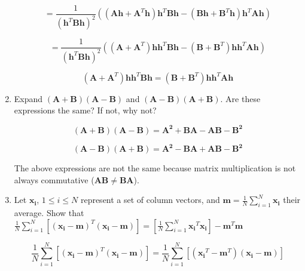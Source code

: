 \documentclass[fleqn]{article}
\begin{document}
\begin{enumerate}
		\begin{equation*}
			 = \frac{1}{(\mathbf{h}^T\mathbf{B}\mathbf{h})^2}\left(\left(\mathbf{Ah} + \mathbf{A}^T\mathbf{h}\right)\mathbf{h}^T\mathbf{B}\mathbf{h} - \left(\mathbf{Bh} + \mathbf{B}^T\mathbf{h}\right)\mathbf{h}^T\mathbf{A}\mathbf{h}\right)
		\end{equation*}
		
		\begin{equation*}
			 = \frac{1}{(\mathbf{h}^T\mathbf{B}\mathbf{h})^2}\left(\left(\mathbf{A} + \mathbf{A}^T\right)\mathbf{h}\mathbf{h}^T\mathbf{B}\mathbf{h} - \left(\mathbf{B} + \mathbf{B}^T\right)\mathbf{h}\mathbf{h}^T\mathbf{A}\mathbf{h}\right)
		\end{equation*}
		
		\begin{equation*}
			\left(\mathbf{A} + \mathbf{A}^T\right)\mathbf{h}\mathbf{h}^T\mathbf{B}\mathbf{h} = \left(\mathbf{B} + \mathbf{B}^T\right)\mathbf{h}\mathbf{h}^T\mathbf{A}\mathbf{h}
		\end{equation*}
		
		\item Expand $(\mathbf{A} + \mathbf{B})(\mathbf{A} - \mathbf{B})$ and $(\mathbf{A} - \mathbf{B})(\mathbf{A} + \mathbf{B})$. Are these expressions the same? If not, why not?
		
		\begin{equation*}
		(\mathbf{A} + \mathbf{B})(\mathbf{A} - \mathbf{B}) = \mathbf{A^2} + \mathbf{B}\mathbf{A} - \mathbf{A}\mathbf{B} - \mathbf{B^2}
		\end{equation*}
		
		\begin{equation*}
		(\mathbf{A} - \mathbf{B})(\mathbf{A} + \mathbf{B}) = \mathbf{A^2} - \mathbf{B}\mathbf{A} + \mathbf{A}\mathbf{B} - \mathbf{B^2}
		\end{equation*}
		
		The above expressions are not the same because matrix multiplication is not always commutative ($\mathbf{AB} \neq \mathbf{BA}$).
		
		\item Let $\mathbf{x_i}$, $1 \leq i \leq N$ represent a set of column vectors, and $\mathbf{m} = \frac{1}{N}\sum_{i=1}^{N}{\mathbf{x_i}}$ their average. Show that $\frac{1}{N}\sum_{i=1}^{N}\left[(\mathbf{x_i}-\mathbf{m})^T(\mathbf{x_i}-\mathbf{m})\right] = \left[\frac{1}{N}\sum_{i=1}^{N}{\mathbf{x_i}^T\mathbf{x_i}}\right]-\mathbf{m}^T\mathbf{m}$
		
		\begin{equation*}
			\frac{1}{N}\sum_{i=1}^{N}\left[(\mathbf{x_i}-\mathbf{m})^T(\mathbf{x_i}-\mathbf{m})\right] = \frac{1}{N}\sum_{i=1}^{N}\left[(\mathbf{x_i}^T-\mathbf{m}^T)(\mathbf{x_i}-\mathbf{m})\right]
		\end{equation*}
			

\end{enumerate}
\end{document}
